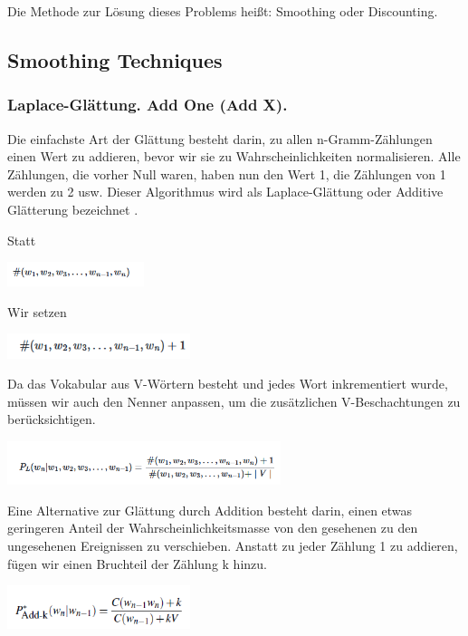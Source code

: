 \documentclass[12pt]{article}
\begin{document}
Die Methode zur Lösung dieses Problems heißt: Smoothing oder Discounting.

\subsection{Smoothing Techniques}
\subsubsection{Laplace-Glättung. Add One (Add X).}
Die einfachste Art der Glättung besteht darin, zu allen n-Gramm-Zählungen einen Wert zu addieren, bevor wir sie zu Wahrscheinlichkeiten normalisieren. Alle Zählungen, die vorher Null waren, haben nun den Wert 1, die Zählungen von 1 werden zu 2 usw. Dieser Algorithmus wird als Laplace-Glättung oder Additive Glätterung bezeichnet \cite{foster2020}.

Statt
\begin{center}
	\includegraphics[width=0.3\textwidth]{statics/Borisov/1.PNG}
\end{center}

Wir setzen
\begin{center}
	\includegraphics[width=0.4\textwidth]{statics/Borisov/2.PNG}
\end{center}

Da das Vokabular aus V-Wörtern besteht und jedes Wort inkrementiert wurde, müssen wir auch den Nenner anpassen, um die zusätzlichen V-Beschachtungen zu berücksichtigen.
\begin{center}
	\includegraphics[width=0.6\textwidth]{statics/Borisov/3.PNG}
\end{center}

\cite{maucher2022}

Eine Alternative zur Glättung durch Addition besteht darin, einen etwas geringeren Anteil der Wahrscheinlichkeitsmasse von den gesehenen zu den ungesehenen Ereignissen zu verschieben. Anstatt zu jeder Zählung 1 zu addieren, fügen wir einen Bruchteil der Zählung k hinzu.
\begin{center}
	\includegraphics[width=0.4\textwidth]{statics/Borisov/4.PNG}
\end{center}
\end{document}
